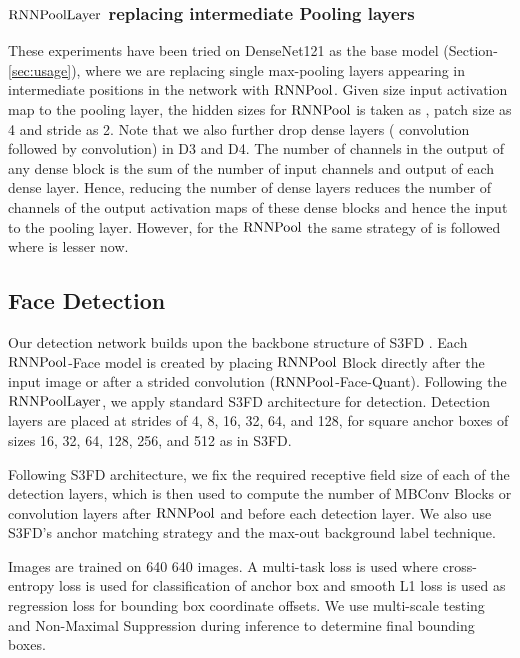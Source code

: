 \documentclass[10pt]{article}
\newcommand{\rpool}{\ensuremath{{\rm RNNPool}}\xspace}
\newcommand{\rpoollayer}{\ensuremath{{\rm RNNPoolLayer}}\xspace}
\begin{document}
\subsubsection{\rpoollayer replacing intermediate Pooling layers}

These experiments have been tried on DenseNet121 as the base model (Section-\ref{sec:usage}), where we are replacing single max-pooling layers appearing in intermediate positions in the network with \rpool. Given  size input activation map to the pooling layer, the hidden sizes for \rpool is taken as , patch size as 4 and stride as 2. Note that we also further drop dense layers ( convolution followed by  convolution) in D3 and D4. The number of channels in the output of any dense block is the sum of the number of input channels and output of each dense layer. Hence, reducing the number of dense layers reduces the number of channels of the output activation maps of these dense blocks and hence the input to the pooling layer. However, for the \rpool the same strategy of  is followed where  is lesser now.





\subsection{Face Detection}
\label{sec:fdmodels}

Our detection network builds upon the backbone structure of S3FD \cite{zhang2017s3fd}. Each \rpool-Face model is created by placing \rpool Block directly after the input image or after a strided convolution (\rpool-Face-Quant). Following the \rpoollayer, we apply standard S3FD architecture for detection. Detection layers are placed at strides of 4, 8, 16, 32, 64, and 128, for square anchor boxes of sizes 16, 32, 64, 128, 256, and 512 as in S3FD. 

Following S3FD architecture, we fix the required receptive field size of each of the detection layers, which is then used to compute the number of MBConv Blocks or convolution layers after \rpool and before each detection layer. We also use S3FD's anchor matching strategy and the max-out background label technique. 

Images are trained on 640  640 images. A multi-task loss is used where cross-entropy loss is used for classification of anchor box and smooth L1 loss is used as regression loss for bounding box coordinate offsets. We use multi-scale testing and Non-Maximal Suppression during inference to determine final bounding boxes.
\end{document}
